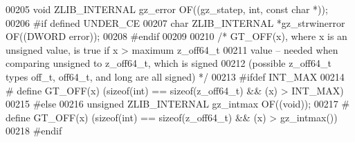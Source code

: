\begin{DoxyCode}
00205 \textcolor{keywordtype}{void} ZLIB\_INTERNAL gz\_error OF((gz\_statep, \textcolor{keywordtype}{int}, \textcolor{keyword}{const} \textcolor{keywordtype}{char} *));
00206 \textcolor{preprocessor}{#if defined UNDER\_CE}
00207 \textcolor{keywordtype}{char} ZLIB\_INTERNAL *gz\_strwinerror OF((DWORD error));
00208 \textcolor{preprocessor}{#endif}
00209 
00210 \textcolor{comment}{/* GT\_OFF(x), where x is an unsigned value, is true if x > maximum z\_off64\_t}
00211 \textcolor{comment}{   value -- needed when comparing unsigned to z\_off64\_t, which is signed}
00212 \textcolor{comment}{   (possible z\_off64\_t types off\_t, off64\_t, and long are all signed) */}
00213 \textcolor{preprocessor}{#ifdef INT\_MAX}
00214 \textcolor{preprocessor}{#  define GT\_OFF(x) (sizeof(int) == sizeof(z\_off64\_t) && (x) > INT\_MAX)}
00215 \textcolor{preprocessor}{#else}
00216 \textcolor{keywordtype}{unsigned} ZLIB\_INTERNAL gz\_intmax OF((\textcolor{keywordtype}{void}));
00217 \textcolor{preprocessor}{#  define GT\_OFF(x) (sizeof(int) == sizeof(z\_off64\_t) && (x) > gz\_intmax())}
00218 \textcolor{preprocessor}{#endif}
\end{DoxyCode}
